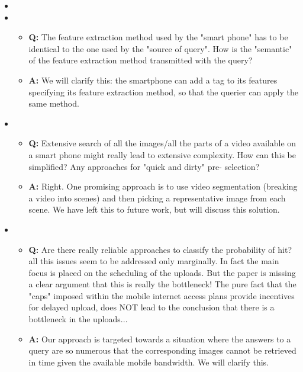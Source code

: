 \begin{itemize}

\item
 
\item
\begin{itemize}
\item \textbf{Q: } The feature extraction method used by the "smart
  phone" has to be identical to the one used by the "source of
  query". How is the "semantic" of the feature extraction method
  transmitted with the query?
\item \textbf{A: } We will clarify this: the smartphone can add a tag
  to its features specifying its feature extraction method, so that
  the querier can apply the same method.
 \end{itemize}
 
\item
\begin{itemize}
\item \textbf{Q: } Extensive search of all the images/all the parts of
  a video available on a smart phone might really lead to extensive
  complexity. How can this be simplified? Any approaches for "quick
  and dirty" pre- selection?
\item \textbf{A: } Right. One promising approach is to use video
  segmentation (breaking a video into scenes) and then picking a
  representative image from each scene. We have left this to future
  work, but will discuss this solution.
 \end{itemize}
 
\item
\begin{itemize}
\item \textbf{Q: } Are there really reliable approaches to classify
  the probability of hit?  all this issues seem to be addressed only
  marginally. In fact the main focus is placed on the scheduling of
  the uploads. But the paper is missing a clear argument that this is
  really the bottleneck! The pure fact that the "caps" imposed within
  the mobile internet access plans provide incentives for delayed
  upload, does NOT lead to the conclusion that there is a bottleneck
  in the uploads...
\item \textbf{A: } Our approach is targeted towards a situation where
  the answers to a query are so numerous that the corresponding images
  cannot be retrieved in time given the available mobile bandwidth.
  We will clarify this.
\end{itemize}


\end{itemize}
